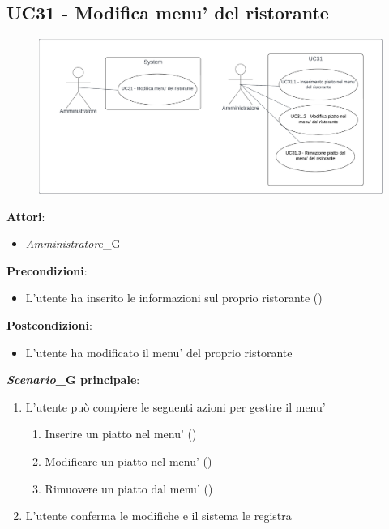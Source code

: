 \subsection{UC31 - Modifica menu' del ristorante}\label{usecase:31}
\begin{figure}[H]
    \centering
    \includegraphics[width=0.9\linewidth]{ucd/UCD31.png}
\end{figure}
\textbf{Attori}:
\begin{itemize}
    \item \textit{Amministratore}_G
\end{itemize}
\textbf{Precondizioni}:
\begin{itemize}
    \item L'utente ha inserito le informazioni sul proprio ristorante ()
\end{itemize}
\textbf{Postcondizioni}:
\begin{itemize}
    \item L'utente ha modificato il menu' del proprio ristorante
\end{itemize}
\textbf{\textit{Scenario}_G principale}:
\begin{enumerate}
    \item L'utente può compiere le seguenti azioni per gestire il menu'
    \begin{enumerate}
        \item Inserire un piatto nel menu' ()
        \item Modificare un piatto nel menu' ()
        \item Rimuovere un piatto dal menu' ()
    \end{enumerate}
    \item L'utente conferma le modifiche e il sistema le registra
\end{enumerate}